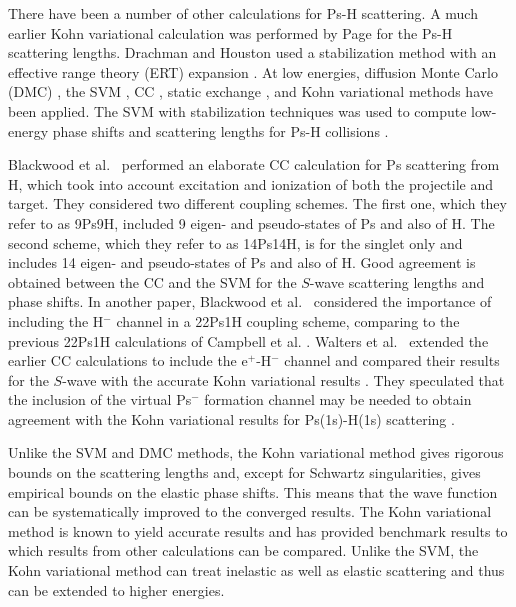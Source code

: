 \documentclass[preprint,showpacs,showkeys,preprintnumbers,amsmath,amssymb,longbibliography,pra,aps]{revtex4-1}
\begin{document}
There have been a number of other calculations for Ps-H scattering. A much 
earlier Kohn variational calculation was performed by Page \cite{Page1976} 
for the Ps-H scattering lengths. Drachman and Houston used a stabilization 
method with an effective range theory (ERT) expansion
\cite{Drachman1975,Drachman1976}. At low energies, diffusion Monte Carlo (DMC)
\cite{Chiesa2002}, the SVM \cite{Ivanov2001,Ivanov2002}, CC
\cite{Sinha1997,Campbell1998,Adhikari1999,Sinha2000,Blackwood2002,Blackwood2002b,Walters2004},
static exchange \cite{Hara1975,Ray1997}, and Kohn variational
\cite{Page1976,VanReeth2003,VanReeth2004} methods have been applied. The SVM
with stabilization 
techniques was used to compute low-energy phase shifts and 
scattering lengths for Ps-H collisions \cite{Ivanov2001,Ivanov2002}.

Blackwood et al.~\cite{Blackwood2002} performed an elaborate CC calculation 
for Ps scattering from H, which took into account excitation and ionization 
of both the projectile and target. They considered two different coupling 
schemes. The first one, which they refer to as 9Ps9H, included 9 eigen- and 
pseudo-states of Ps and also of H. The second scheme, which they refer to as 
14Ps14H, is for the singlet only and includes 14 eigen- and pseudo-states of 
Ps and also of H. Good agreement is obtained between the CC
\cite{Blackwood2002} and the SVM \cite{Ivanov2002} for the $S$-wave scattering
lengths and phase shifts. In another paper, Blackwood et
al.~\cite{Blackwood2002b} considered the importance of including the H$^-$
channel in a 22Ps1H coupling scheme, comparing to the previous 22Ps1H
calculations of Campbell et al. \cite{Campbell1998}. Walters et
al.~\cite{Walters2004} extended the earlier CC calculations
\cite{Blackwood2002} to include the e$^+$-H$^-$ channel
\cite{Blackwood2002b} and compared their results for the $S$-wave with the
accurate Kohn variational results \cite{VanReeth2003}. They speculated that the
inclusion of the virtual Ps$^-$ formation channel may be needed to obtain 
agreement with the Kohn variational results for Ps(1s)-H(1s) scattering 
\cite{Blackwood2002}.

Unlike the SVM and DMC methods, the Kohn variational method gives rigorous 
bounds on the scattering lengths and, except for Schwartz singularities, 
gives empirical bounds on the elastic phase shifts. This means that the wave 
function can be systematically improved to the converged results. The Kohn 
variational method is known to yield accurate results and has provided 
benchmark results \cite{VanReeth2003,VanReeth2004} to which results from 
other calculations can be compared. Unlike the SVM, the Kohn variational 
method can treat inelastic as well as elastic scattering and thus can be 
extended to higher energies. 
\end{document}
